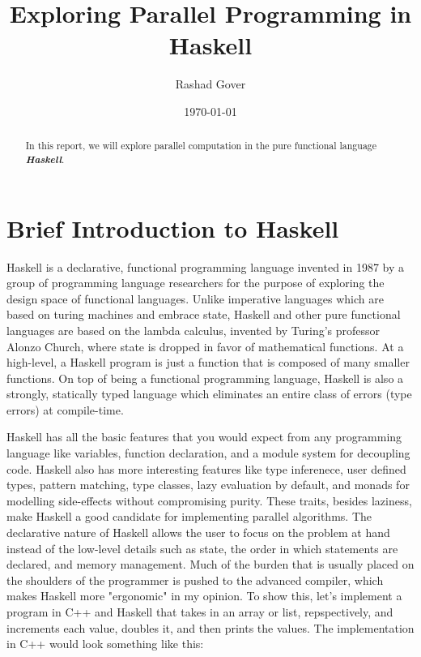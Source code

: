 \documentclass[a4paper, 10pt]{article}
\author{Rashad Gover}
\date{\today}
\title{Exploring Parallel Programming in Haskell}
\begin{document}
\maketitle

\newpage
\tableofcontents

\newpage

\begin{abstract}
  In this report, we will explore parallel computation in the pure functional language \textbf{\textit{Haskell}}.
\end{abstract}

\section{Brief Introduction to Haskell}
Haskell is a declarative, functional programming language invented in 1987 by a group of programming language researchers for the purpose of exploring the design space of functional languages. Unlike imperative languages which are based on turing machines and embrace state, Haskell and other pure functional languages are based on the lambda calculus, invented by Turing's professor Alonzo Church, where state is dropped in favor of mathematical functions. At a high-level, a Haskell program is just a function that is composed of many smaller functions. On top of being a functional programming language, Haskell is also a strongly, statically typed language which eliminates an entire class of errors (type errors) at compile-time. 

Haskell has all the basic features that you would expect from any programming language like variables, function declaration,  and a module system for decoupling code. Haskell also has more interesting features like type inferenece, user defined types, pattern matching, type classes, lazy evaluation by default, and monads for modelling side-effects without compromising purity. These traits, besides laziness, make Haskell a good candidate for implementing parallel algorithms. The declarative nature of Haskell allows the user to focus on the problem at hand instead of the low-level details such as state, the order in which statements are declared, and memory management.  Much of the burden that is usually placed on the shoulders of the programmer is pushed to the advanced compiler, which makes Haskell more "ergonomic" in my opinion. To show this, let's implement a program in C++ and Haskell that takes in an array or list, repspectively, and increments each value, doubles it, and then prints the values. The implementation in C++ would look something like this:
\end{document}
